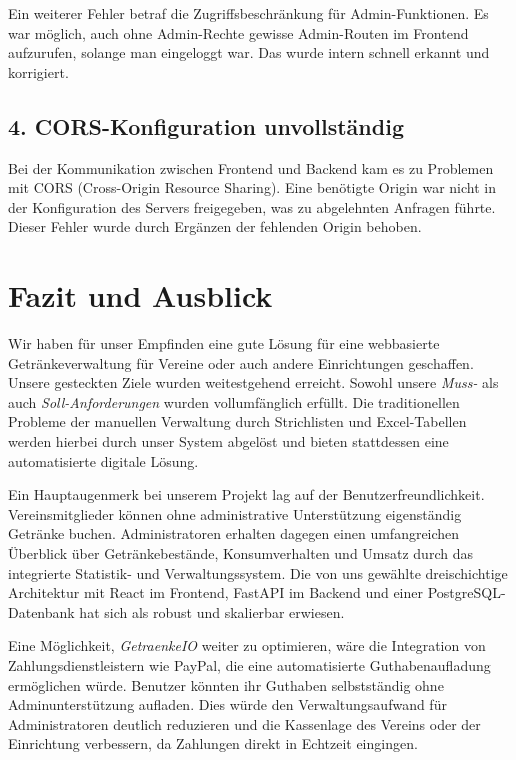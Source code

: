 \documentclass[conference,a4paper]{cs-techrep}
\begin{document}
Ein weiterer Fehler betraf die Zugriffsbeschränkung für Admin-Funktionen. Es war möglich, auch ohne Admin-Rechte gewisse Admin-Routen im Frontend aufzurufen, solange man eingeloggt war. Das wurde intern schnell erkannt und korrigiert.

\subsection*{4. CORS-Konfiguration unvollständig}

Bei der Kommunikation zwischen Frontend und Backend kam es zu Problemen mit CORS (Cross-Origin Resource Sharing). Eine benötigte Origin war nicht in der Konfiguration des Servers freigegeben, was zu abgelehnten Anfragen führte. Dieser Fehler wurde durch Ergänzen der fehlenden Origin behoben.


\section{Fazit und Ausblick} %

Wir haben für unser Empfinden eine gute Lösung für eine webbasierte Getränkeverwaltung für Vereine oder auch andere Einrichtungen geschaffen. Unsere gesteckten Ziele wurden weitestgehend erreicht. Sowohl unsere \emph{Muss-} als auch \emph{Soll-Anforderungen} wurden vollumfänglich erfüllt. Die traditionellen Probleme der manuellen Verwaltung durch Strichlisten und Excel-Tabellen werden hierbei durch unser System abgelöst und bieten stattdessen eine automatisierte digitale Lösung.

Ein Hauptaugenmerk bei unserem Projekt lag auf der Benutzerfreundlichkeit. Vereinsmitglieder können ohne administrative Unterstützung eigenständig Getränke buchen. Administratoren erhalten dagegen einen umfangreichen Überblick über Getränkebestände, Konsumverhalten und Umsatz durch das integrierte Statistik- und Verwaltungssystem. Die von uns gewählte dreischichtige Architektur mit React im Frontend, FastAPI im Backend und einer PostgreSQL-Datenbank hat sich als robust und skalierbar erwiesen.

Eine Möglichkeit, \textit{GetraenkeIO} weiter zu optimieren, wäre die Integration von Zahlungsdienstleistern wie PayPal, die eine automatisierte Guthabenaufladung ermöglichen würde. Benutzer könnten ihr Guthaben selbstständig ohne Adminunterstützung aufladen. Dies würde den Verwaltungsaufwand für Administratoren deutlich reduzieren und die Kassenlage des Vereins oder der Einrichtung verbessern, da Zahlungen direkt in Echtzeit eingingen.
\end{document}
